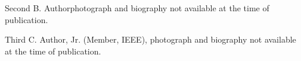 \documentclass{IEEEtaes}
\begin{document}
\begin{IEEEbiography}{Second B. Author}{\space}photograph and biography not available at the time of publication.
\end{IEEEbiography}

\begin{IEEEbiography}{Third C. Author, Jr.} (Member, IEEE), photograph and biography not available at the time of publication.
\end{IEEEbiography}
\end{document}
